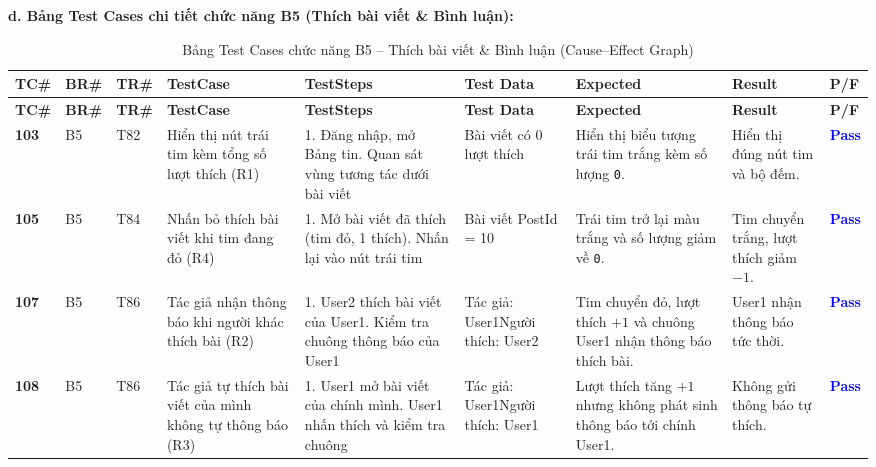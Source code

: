 \documentclass[11pt,a4paper]{article}
\begin{document}
\noindent\textbf{d. Bảng Test Cases chi tiết chức năng B5 (Thích bài viết \& Bình luận):}
\begingroup
\scriptsize
\setlength{\tabcolsep}{3pt}
\setlength{\LTpre}{4pt}
\setlength{\LTpost}{4pt}
\renewcommand{\arraystretch}{0.88}
\begin{longtable}{|C{0.8cm}|C{0.85cm}|C{0.95cm}|L{2.0cm}|L{3.0cm}|L{2.15cm}|L{2.6cm}|L{2.5cm}|C{0.85cm}|}
\hline
{}
\textbf{TC\#} & \textbf{BR\#} & \textbf{TR\#} & \textbf{TestCase} & \textbf{TestSteps} & \textbf{Test Data} & \textbf{Expected} & \textbf{Result} & \textbf{P/F} \tabularnewline
\hline
\endfirsthead
\hline
{}
\textbf{TC\#} & \textbf{BR\#} & \textbf{TR\#} & \textbf{TestCase} & \textbf{TestSteps} & \textbf{Test Data} & \textbf{Expected} & \textbf{Result} & \textbf{P/F} \tabularnewline
\hline
\endhead
\hline
\endfoot
\hline
\caption{Bảng Test Cases chức năng B5 -- Thích bài viết \& Bình luận (Cause--Effect Graph)}
\endlastfoot
\textbf{103} & B5 & T82 & Hiển thị nút trái tim kèm tổng số lượt thích (R1) & 1. Đăng nhập, mở Bảng tin. Quan sát vùng tương tác dưới bài viết & Bài viết có 0 lượt thích & Hiển thị biểu tượng trái tim trắng kèm số lượng \texttt{0}. & Hiển thị đúng nút tim và bộ đếm. & \textcolor{blue}{\textbf{Pass}} \\ \hline
\textbf{105} & B5 & T84 & Nhấn bỏ thích bài viết khi tim đang đỏ (R4) & 1. Mở bài viết đã thích (tim đỏ, 1 thích). Nhấn lại vào nút trái tim & Bài viết PostId = 10 & Trái tim trở lại màu trắng và số lượng giảm về \texttt{0}. & Tim chuyển trắng, lượt thích giảm $-1$. & \textcolor{blue}{\textbf{Pass}} \\ \hline
\textbf{107} & B5 & T86 & Tác giả nhận thông báo khi người khác thích bài (R2) & 1. User2 thích bài viết của User1. Kiểm tra chuông thông báo của User1 & Tác giả: User1\newline Người thích: User2 & Tim chuyển đỏ, lượt thích $+1$ và chuông User1 nhận thông báo thích bài. & User1 nhận thông báo tức thời. & \textcolor{blue}{\textbf{Pass}} \\ \hline
\textbf{108} & B5 & T86 & Tác giả tự thích bài viết của mình không tự thông báo (R3) & 1. User1 mở bài viết của chính mình. User1 nhấn thích và kiểm tra chuông & Tác giả: User1\newline Người thích: User1 & Lượt thích tăng $+1$ nhưng không phát sinh thông báo tới chính User1. & Không gửi thông báo tự thích. & \textcolor{blue}{\textbf{Pass}} \\ \hline
\end{longtable}
\endgroup
\end{document}
